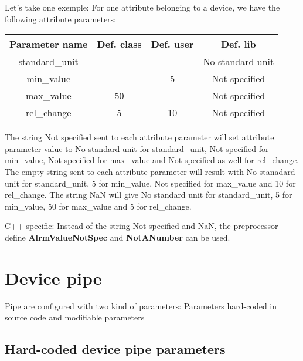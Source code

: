 \vspace{0.3cm}


\begin{center}
Let's take one exemple: For one attribute belonging to a device, we
have the following attribute parameters:\vspace{0.3cm}
\begin{longtable}{|c|c|c|c|}
\hline 
Parameter name & Def. class & Def. user & Def. lib\tabularnewline
\hline 
\hline 
standard\_unit &  &  & No standard unit\tabularnewline
\hline 
min\_value &  & 5 & Not specified\tabularnewline
\hline 
max\_value & 50 &  & Not specified\tabularnewline
\hline 
rel\_change & 5 & 10 & Not specified\tabularnewline
\hline 
\end{longtable}
\par\end{center}

\vspace{0.3cm}


The string \textquotedbl{}Not specified\textquotedbl{} sent to each
attribute parameter will set attribute parameter value to \textquotedbl{}No
standard unit\textquotedbl{} for standard\_unit, \textquotedbl{}Not
specified\textquotedbl{} for min\_value, \textquotedbl{}Not specified\textquotedbl{}
for max\_value and \textquotedbl{}Not specified\textquotedbl{} as
well for rel\_change. The empty string sent to each attribute parameter
will result with \textquotedbl{}No stanadard unit\textquotedbl{} for
standard\_unit, 5 for min\_value, \textquotedbl{}Not specified\textquotedbl{}
for max\_value and 10 for rel\_change. The string \textquotedbl{}NaN\textquotedbl{}
will give \textquotedbl{}No standard unit\textquotedbl{} for standard\_unit,
5 for min\_value, 50 for max\_value and 5 for rel\_change.

C++ specific: Instead of the string \textquotedbl{}Not specified\textquotedbl{}
and \textquotedbl{}NaN\textquotedbl{}, the preprocessor define\textbf{
AlrmValueNotSpec} and \textbf{NotANumber} can be used.


\section{Device pipe}

Pipe are configured with two kind of parameters: Parameters hard-coded
in source code and modifiable parameters


\subsection{Hard-coded device pipe parameters}

